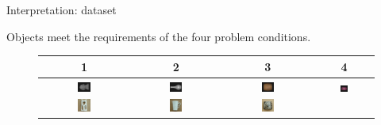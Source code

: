 \documentclass[10pt]{beamer}
\begin{document}

\begin{frame}{Interpretation: dataset}

Objects meet the requirements of the four problem conditions.

\begin{figure}[!htbp]
\centering
\begin{tabular}{*{4}{c}} %
1 & 2 & 3 & 4\\
\midrule 
\includegraphics[width=0.15\textwidth]{interp/synth_data/bust} &
\includegraphics[width=0.15\textwidth]{interp/synth_data/vase0} &
\includegraphics[width=0.15\textwidth]{interp/synth_data/barrel} &
\includegraphics[width=0.15\textwidth]{interp/synth_data/vase1}\\
\includegraphics[width=0.15\textwidth]{interp/real_world_img/statue/statue} &
\includegraphics[width=0.15\textwidth]{interp/real_world_img/cup/cup} &
\includegraphics[width=0.15\textwidth]{interp/real_world_img/pot/pot} &

\end{tabular}
\end{figure}
\end{frame}
\end{document}

